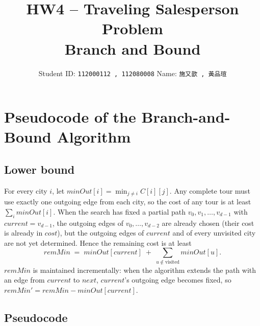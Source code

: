 \documentclass[11pt]{article}
\title{HW4 -- Traveling Salesperson Problem\\[2pt]\large Branch and Bound}
\author{Student ID: \texttt{112000112 , 112080008} \quad Name: \texttt{施又歆 , 黃品瑄}}
\begin{document}
\maketitle

\section{Pseudocode of the Branch-and-Bound Algorithm}

\subsection*{Lower bound}

For every city $i$, let $\mathit{minOut}[i]=\min_{j \ne i} C[i][j]$.
Any complete tour must use exactly one outgoing edge from each city, so the
cost of any tour is at least $\sum_i \mathit{minOut}[i]$.  When the search has
fixed a partial path $v_0,v_1,\dots,v_{d-1}$ with
$\mathit{current}=v_{d-1}$, the outgoing edges of $v_0,\dots,v_{d-2}$ are
already chosen (their cost is already in $\mathit{cost}$), but the outgoing
edges of $\mathit{current}$ and of every unvisited city are not yet
determined.  Hence the remaining cost is at least
\[
\mathit{remMin} \;=\; \mathit{minOut}[\mathit{current}]
                     \;+\; \sum_{u \notin \text{visited}} \mathit{minOut}[u].
\]
$\mathit{remMin}$ is maintained incrementally: when the algorithm extends the
path with an edge from $\mathit{current}$ to $\mathit{next}$,
$\mathit{current}$'s outgoing edge becomes fixed, so
$\mathit{remMin}' = \mathit{remMin} - \mathit{minOut}[\mathit{current}]$.

\subsection*{Pseudocode}
\end{document}
